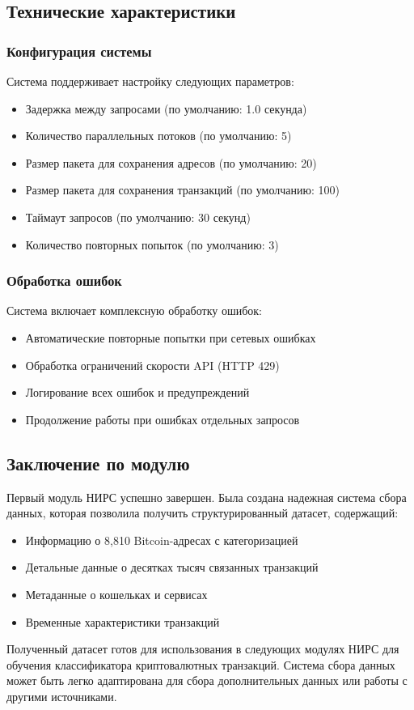 \subsection{Технические характеристики}

\subsubsection{Конфигурация системы}

Система поддерживает настройку следующих параметров:

\begin{itemize}
    \item Задержка между запросами (по умолчанию: 1.0 секунда)
    \item Количество параллельных потоков (по умолчанию: 5)
    \item Размер пакета для сохранения адресов (по умолчанию: 20)
    \item Размер пакета для сохранения транзакций (по умолчанию: 100)
    \item Таймаут запросов (по умолчанию: 30 секунд)
    \item Количество повторных попыток (по умолчанию: 3)
\end{itemize}

\subsubsection{Обработка ошибок}

Система включает комплексную обработку ошибок:

\begin{itemize}
    \item Автоматические повторные попытки при сетевых ошибках
    \item Обработка ограничений скорости API (HTTP 429)
    \item Логирование всех ошибок и предупреждений
    \item Продолжение работы при ошибках отдельных запросов
\end{itemize}

\subsection{Заключение по модулю}

Первый модуль НИРС успешно завершен. Была создана надежная система сбора данных, которая позволила получить структурированный датасет, содержащий:

\begin{itemize}
    \item Информацию о 8,810 Bitcoin-адресах с категоризацией
    \item Детальные данные о десятках тысяч связанных транзакций
    \item Метаданные о кошельках и сервисах
    \item Временные характеристики транзакций
\end{itemize}

Полученный датасет готов для использования в следующих модулях НИРС для обучения классификатора криптовалютных транзакций. Система сбора данных может быть легко адаптирована для сбора дополнительных данных или работы с другими источниками.
